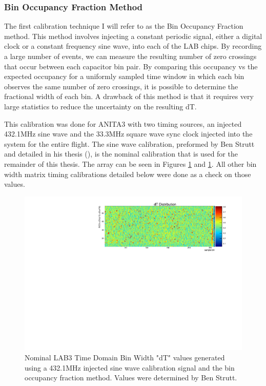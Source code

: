 	\subsubsection{Bin Occupancy Fraction Method}
		
		The first calibration technique I will refer to as the Bin Occupancy Fraction method.  This method involves injecting a constant periodic signal, either a digital clock or a constant frequency sine wave, into each of the LAB chips.  By recording a large number of events, we can measure the resulting number of zero crossings that occur between each capacitor bin pair.  By comparing this occupancy vs the expected occupancy for a uniformly sampled time window in which each bin observes the same number of zero crossings, it is possible to determine the fractional width of each bin.  A drawback of this method is that it requires very large statistics to reduce the uncertainty on the resulting dT.  
		
		This calibration was done for ANITA3 with two timing sources, an injected 432.1MHz sine wave and the 33.3MHz square wave sync clock injected into the system for the entire flight.  The sine wave calibration, preformed by Ben Strutt and detailed in his thesis (\cite{benSThesis}), is the nominal calibration that is used for the remainder of this thesis.  The array can be seen in Figures \ref{fig:dTNominal2D} and \ref{fig:dTNominal2D}.  All other bin width matrix timing calibrations detailed below were done as a check on those values.
		
	\begin{figure}
		\includegraphics[width=\textwidth]{figures/dTNominal2D}
		\caption{Nominal LAB3 Time Domain Bin Width "dT" values generated using a 432.1MHz injected sine wave calibration signal and the bin occupancy fraction method.  Values were determined by Ben Strutt\cite{benSThesis}.}
		\label{fig:dTNominal2D}
	\end{figure}
	
